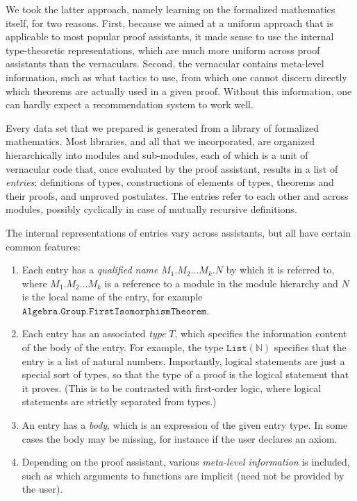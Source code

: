 \documentclass{article}
\begin{document}
We took the latter approach, namely learning on the formalized mathematics itself, for two reasons. First, because we aimed at a uniform approach that is applicable to most popular proof assistants, it made sense to use the internal type-theoretic representations, which are much more uniform across proof assistants than the vernaculars. Second, the vernacular contains meta-level information, such as what tactics to use, from which one cannot discern directly which theorems are actually used in a given proof. Without this information, one can hardly expect a recommendation system to work well.

Every data set that we prepared is generated from a library of formalized mathematics. Most libraries, and all that we incorporated, are organized hierarchically into modules and sub-modules, each of which is a unit of vernacular code that, once evaluated by the proof assistant, results in a list of \emph{entries}: definitions of types, constructions of elements of types, theorems and their proofs, and unproved postulates. The entries refer to each other and across modules, possibly cyclically in case of mutually recursive definitions.

The internal representations of entries vary across assistants, but all have certain common features:
%
\begin{enumerate}
    \item Each entry has a \emph{qualified name} $M_1.M_2 \ldots M_k.N$ by which it is referred to, where $M_1.M_2\ldots M_k$ is a reference to a module in the module hierarchy and $N$ is the local name of the entry, for example $\mathtt{Algebra}.\mathtt{Group}.\mathtt{FirstIsomorphismTheorem}$.
    \item Each entry has an associated \emph{type} $T$, which specifies the information content of the body of the entry. For example, the type $\mathtt{List}(\mathbb{N})$ specifies that the entry is a list of natural numbers. Importantly, logical statements are just a special sort of types, so that the type of a proof is the logical statement that it proves. (This is to be contrasted with first-order logic, where logical statements are strictly separated from types.)
    \item An entry has a \emph{body}, which is an expression of the given entry type. In some cases the body may be missing, for instance if the user declares an axiom.
    \item Depending on the proof assistant, various \emph{meta-level information} is included, such as which arguments to functions are implicit (need not be provided by the user).
\end{enumerate}
\end{document}
